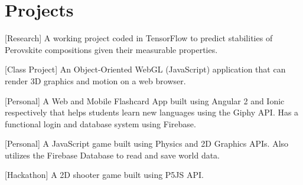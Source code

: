\documentclass[]{hieudo-build}
\begin{document}
\begin{minipage}[t]{0.65\textwidth}

\section{Projects}
\descript{}
[Research] A working project coded in TensorFlow to predict stabilities of Perovskite compositions given their measurable properties.
\sectionsep

\descript{}
[Class Project] An Object-Oriented WebGL (JavaScript) application that can render 3D graphics and motion on a web browser.
\sectionsep

\descript{}
[Personal] A Web and Mobile Flashcard App built using Angular 2 and Ionic respectively that helps students learn new languages using the Giphy API. Has a functional login and database system using Firebase.
\sectionsep 

\descript{}
[Personal] A JavaScript game built using Physics and 2D Graphics APIs. Also utilizes the Firebase Database to read and save world data.
\sectionsep

\descript{}
[Hackathon] A 2D shooter game built using P5JS API.
\sectionsep 

\end{minipage} 
\end{document}
